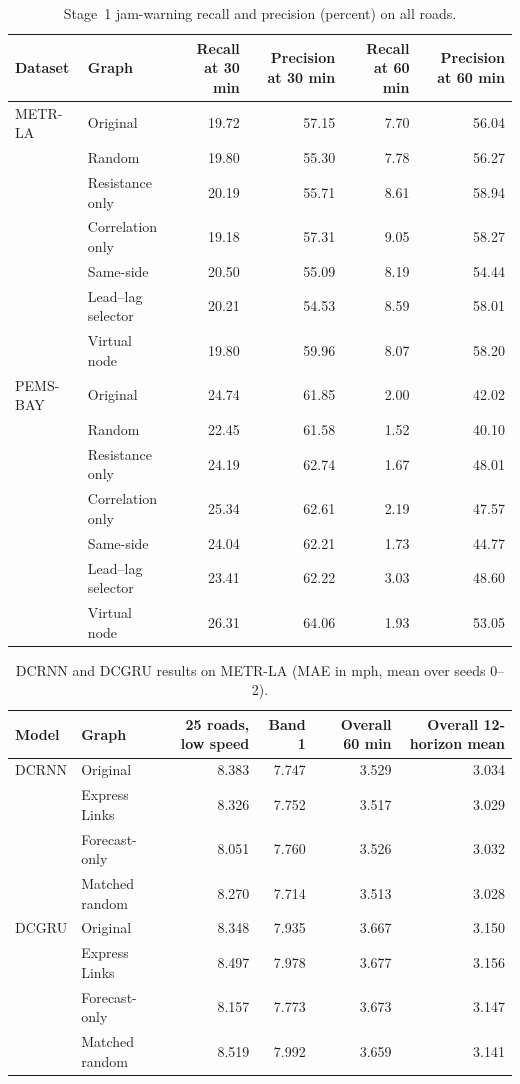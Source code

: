 \begin{table}[H]
\centering
\small
\caption{Stage~1 jam-warning recall and precision (percent) on all roads.}
\label{tab:events}
\begin{tabular}{@{}llrrrr@{}}
\toprule
Dataset & Graph & Recall at 30 min & Precision at 30 min & Recall at 60 min & Precision at 60 min \\
\midrule
METR-LA & Original & 19.72 & 57.15 & 7.70 & 56.04 \\
 & Random & 19.80 & 55.30 & 7.78 & 56.27 \\
 & Resistance only & 20.19 & 55.71 & 8.61 & 58.94 \\
 & Correlation only & 19.18 & 57.31 & 9.05 & 58.27 \\
 & Same-side & 20.50 & 55.09 & 8.19 & 54.44 \\
 & Lead--lag selector & 20.21 & 54.53 & 8.59 & 58.01 \\
 & Virtual node & 19.80 & 59.96 & 8.07 & 58.20 \\
PEMS-BAY & Original & 24.74 & 61.85 & 2.00 & 42.02 \\
 & Random & 22.45 & 61.58 & 1.52 & 40.10 \\
 & Resistance only & 24.19 & 62.74 & 1.67 & 48.01 \\
 & Correlation only & 25.34 & 62.61 & 2.19 & 47.57 \\
 & Same-side & 24.04 & 62.21 & 1.73 & 44.77 \\
 & Lead--lag selector & 23.41 & 62.22 & 3.03 & 48.60 \\
 & Virtual node & 26.31 & 64.06 & 1.93 & 53.05 \\
\bottomrule
\end{tabular}
\end{table}

\begin{table}[H]
\centering
\small
\caption{DCRNN and DCGRU results on METR-LA (MAE in mph, mean over seeds 0--2).}
\label{tab:second_models}
\begin{tabular}{@{}llrrrr@{}}
\toprule
Model & Graph & 25 roads, low speed & Band 1 & Overall 60 min & Overall 12-horizon mean \\
\midrule
DCRNN & Original & 8.383 & 7.747 & 3.529 & 3.034 \\
 & Express Links & 8.326 & 7.752 & 3.517 & 3.029 \\
 & Forecast-only & 8.051 & 7.760 & 3.526 & 3.032 \\
 & Matched random & 8.270 & 7.714 & 3.513 & 3.028 \\
DCGRU & Original & 8.348 & 7.935 & 3.667 & 3.150 \\
 & Express Links & 8.497 & 7.978 & 3.677 & 3.156 \\
 & Forecast-only & 8.157 & 7.773 & 3.673 & 3.147 \\
 & Matched random & 8.519 & 7.992 & 3.659 & 3.141 \\
\bottomrule
\end{tabular}
\end{table}
